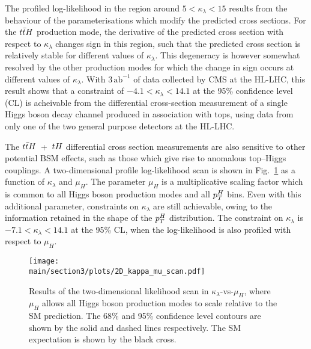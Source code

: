 The profiled log-likelihood in the region around 
$5<\kappa_\lambda<15$ results from the behaviour of the parameterisations which modify the predicted cross sections. For the $t\bar{t}H$ production mode, the derivative of the predicted cross section with respect to $\kappa_\lambda$ changes sign in this region, such that the predicted cross section is relatively stable for different values of $\kappa_\lambda$. This degeneracy is however somewhat resolved by the  other production modes for which the change in sign occurs at different values of $\kappa_\lambda$. With $3\,\text{ab}^{-1}$ of data collected by CMS at the HL-LHC, this result shows that a constraint of $-4.1 < \kappa_\lambda < 14.1$ at the 95\% confidence level (CL) is acheivable from the differential cross-section measurement of a single Higgs boson decay channel produced in association with tops, using data from only one of the two general purpose detectors at the HL-LHC.  


The $t\bar{t}H$~+~$tH$ differential cross section measurements are also sensitive to other potential BSM effects, such as those which give rise to anomalous top--Higgs couplings. A two-dimensional profile log-likelihood scan is shown in  Fig.~\ref{fig:ttHdiff_CMS_klambda_2Dscan} as a function of $\kappa_\lambda$ and $\mu_{H}$. The parameter $\mu_{H}$ is a multiplicative scaling factor which is common to all Higgs boson production modes and all $p_{T}^{H}$ bins. Even with this additional parameter, constraints on $\kappa_\lambda$ are still achievable, owing to the information retained in the shape of the $p_{T}^{H}$ distribution. The constraint on $\kappa_\lambda$ is $-7.1 < \kappa_\lambda < 14.1$ at the 95\% CL, when the log-likelihood is also profiled with respect to $\mu_{H}$. 

\begin{figure}[htb!]
        \centering
        \texttt{[image: \\main/section3/plots/2D\_kappa\_mu\_scan.pdf]}
        \caption{Results of the two-dimensional likelihood scan in $\kappa_\lambda$-vs-$\mu_{H}$, where $\mu_{H}$ allows all Higgs boson production modes to scale relative to the SM prediction. The 68\% and 95\% confidence level contours are shown by the solid and dashed lines respectively. The SM expectation is shown by the black cross.}
        \label{fig:ttHdiff_CMS_klambda_2Dscan}
\end{figure}


